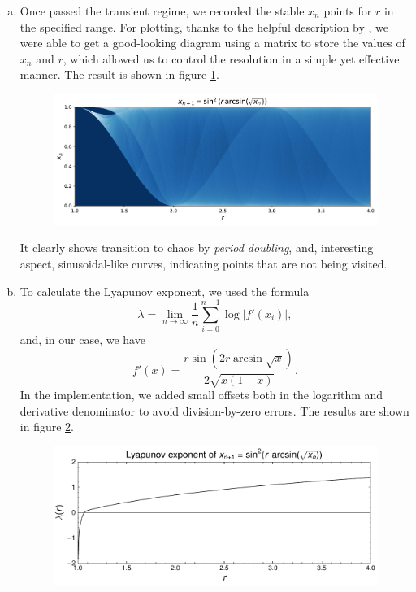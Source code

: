 \begin{enumerate}[(a)]

    \item Once passed the transient regime, we recorded the stable $x_n$ points
    for $r$ in the specified range. For plotting, thanks to the helpful description
    by \cite{WikiTentMap}, we were able to get a good-looking diagram using a
    matrix to store the values of $x_n$ and $r$, which allowed us to control
    the resolution in a simple yet effective manner. The result is shown in figure
    \ref{fig:5a}.

    \begin{figure}[!ht]
        \centering
        \includegraphics[scale=0.65]{images/5a[1-4].pdf}
        \label{fig:5a}
    \end{figure}

    It clearly shows transition to chaos by \textit{period doubling}, and, interesting
    aspect, sinusoidal-like curves, indicating points that are not being visited.
    \item To calculate the Lyapunov exponent, we used the formula
    \[
        \lambda = \lim_{n \to \infty} \frac{1}{n} \sum_{i=0}^{n-1} \log{|f'(x_i)|},
    \]
    and, in our case, we have
    \[
        f'(x) = \frac{r\sin{\left(2r\arcsin{\sqrt{x}}\right)}}{2\sqrt{x(1-x)}}.
    \]
    In the implementation, we added small offsets both in the logarithm and 
    derivative denominator to avoid division-by-zero errors. The results are shown
    in figure \ref{fig:5b}.

    \begin{figure}[!ht]
        \centering
        \includegraphics[scale=0.75]{images/5b[1-4].pdf}
        \label{fig:5b}
    \end{figure}


\end{enumerate}
